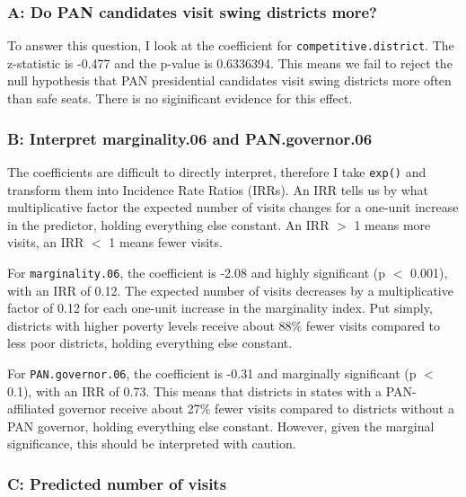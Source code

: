 \documentclass[12pt,letterpaper]{article}
\begin{document}
\subsubsection{A: Do PAN candidates visit swing districts more?}

\noindent To answer this question, I look at the coefficient for \texttt{competitive.district}. The z-statistic is -0.477 and the p-value is 0.6336394. This means we fail to reject the null hypothesis that PAN presidential candidates visit swing districts more often than safe seats. There is no siginificant evidence for this effect.\newline

\subsubsection{B: Interpret marginality.06 and PAN.governor.06}

 \noindent The coefficients are difficult to directly interpret, therefore I take 
\texttt{exp()} and transform them into Incidence Rate Ratios (IRRs). An IRR tells 
us by what multiplicative factor the expected number of visits changes for a 
one-unit increase in the predictor, holding everything else constant. An IRR $>$ 1  means more visits, an IRR $<$ 1 means fewer visits.\newline

\noindent For \texttt{marginality.06}, the coefficient is -2.08 and highly significant (p $<$ 0.001), with an IRR of 0.12. The expected number of visits 
decreases by a multiplicative factor of 0.12 for each one-unit increase in the marginality index. Put simply, districts with higher poverty levels receive about 88\% fewer visits compared to less poor districts, holding everything else 
constant.\newline

\noindent For \texttt{PAN.governor.06}, the coefficient is -0.31 and marginally 
significant (p $<$ 0.1), with an IRR of 0.73. This means that districts in states 
with a PAN-affiliated governor receive about 27\% fewer visits compared to 
districts without a PAN governor, holding everything else constant. However, given the marginal significance, this should be interpreted with caution.\newline

\subsubsection{C: Predicted number of visits}
\end{document}
